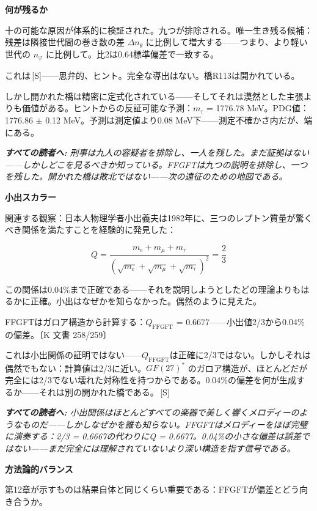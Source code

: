 \documentclass[11pt,openany]{book}
\newcommand{\status}[1]{\penalty10000\,{\tiny\textcolor{gray!70}{[#1]}}}
\newenvironment{laierspur}{%
  \par\vspace{4pt}%
  \noindent\small\itshape\color{blue!60!black}%
  \textbf{すべての読者へ:}\enspace\ignorespaces}{%
  \par\vspace{4pt}\normalsize\normalfont\normalcolor}
\begin{document}
\textbf{何が残るか}

十の可能な原因が体系的に検証された。九つが排除される。唯一生き残る候補：残差は隣接世代間の巻き数の差 $\Delta n_\theta$ に比例して増大する——つまり、より軽い世代の $n_\varphi$ に比例して。比2は0.64標準偏差で一致する。

これは\status{S}——思弁的、ヒント。完全な導出はない。橋R113は開かれている。

しかし開かれた橋は精密に定式化されている——そしてそれは漠然とした主張よりも価値がある。ヒントからの反証可能な予測：$m_\tau$ = 1776.78 MeV。PDG値：1776.86 $\pm$ 0.12 MeV。予測は測定値より0.08 MeV下——測定不確かさ内だが、端にある。

\begin{laierspur}
刑事は九人の容疑者を排除し、一人を残した。まだ証拠はない——しかしどこを見るべきか知っている。FFGFTは九つの説明を排除し、一つを残した。開かれた橋は敗北ではない——次の遠征のための地図である。
\end{laierspur}

\textbf{小出スカラー}

関連する観察：日本人物理学者小出義夫は1982年に、三つのレプトン質量が驚くべき関係を満たすことを経験的に発見した：

\[Q = \frac{m_e+m_\mu+m_\tau}{(\sqrt{m_e}+\sqrt{m_\mu}+\sqrt{m_\tau})^2} = \frac{2}{3}\]

この関係は0.04\%まで正確である——それを説明しようとしたどの理論よりもはるかに正確。小出はなぜかを知らなかった。偶然のように見えた。

FFGFTはガロア構造から計算する：$Q_\text{FFGFT}$ = 0.6677——小出値2/3から0.04\%の偏差。〔K 文書 258/259〕

これは小出関係の証明ではない——$Q_\text{FFGFT}$は正確に2/3ではない。しかしそれは偶然でもない：計算値は2/3に近い。$GF(27)^*$ のガロア構造が、ほとんどだが完全には2/3でない壊れた対称性を持つからである。0.04\%の偏差を何が生成するか——それは別の開かれた橋である。\status{S}

\begin{laierspur}
小出関係はほとんどすべての楽器で美しく響くメロディーのようなものだ——しかしなぜかを誰も知らない。FFGFTはメロディーをほぼ完璧に演奏する：2/3 = 0.6667の代わりにQ = 0.6677。0.04\%の小さな偏差は誤差ではない——まだ完全には理解されていないより深い構造を指す信号である。
\end{laierspur}

\textbf{方法論的バランス}

第12章が示すものは結果自体と同じくらい重要である：FFGFTが偏差とどう向き合うか。
\end{document}
